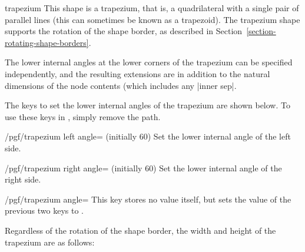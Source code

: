 \begin{shape}{trapezium}
  This shape is a trapezium, that is, a quadrilateral with a single
  pair of parallel lines (this can sometimes be known as a trapezoid).
  The trapezium shape supports the rotation of the shape border, as 
  described in Section~\ref{section-rotating-shape-borders}. 
  
  The lower internal angles at the lower corners of the trapezium can 
  be specified independently, and the resulting extensions are in 
  addition to the natural dimensions of the node contents (which
  includes any |inner sep|.
	
\begin{codeexample}[]
\end{codeexample}

         
  The \pgfname{} keys to set the lower internal angles of the trapezium 
  are shown below. 
  To use these keys in \tikzname, simply remove the  path.
	
  \begin{key}{/pgf/trapezium left angle= (initially 60)}
    Set the lower internal angle of the left side. 
  \end{key}
   
  \begin{key}{/pgf/trapezium right angle= (initially 60)}
    Set the lower internal angle of the right side. 
  \end{key}
  
  \begin{stylekey}{/pgf/trapezium angle=}
    This key stores no value itself, but sets the value of the
    previous two keys to . 
  \end{stylekey}
     
  Regardless of the rotation of the shape border, the width
  and height of the trapezium are as follows:

\begin{codeexample}[]
\end{codeexample}


\end{shape}
